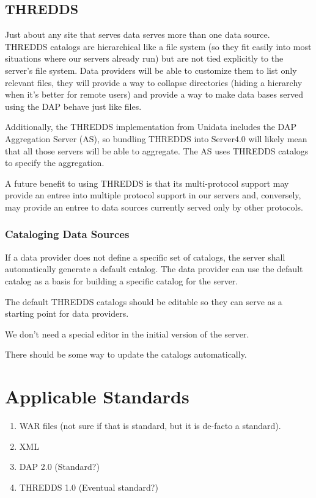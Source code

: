 \documentclass[justify]{dods-paper}
\begin{document}
\subsection{THREDDS}

Just about any site that serves data serves more than one data source. THREDDS catalogs are hierarchical like a file system (so they fit easily into most situations where our servers already run) but are not tied explicitly to the server's file system. Data providers will be able to customize them to list only relevant files, they will provide a way to collapse directories (hiding a hierarchy when it's better for remote users) and provide a way to make data bases served using the DAP behave just like files.

Additionally, the THREDDS implementation from Unidata includes the DAP Aggregation Server (AS), so bundling THREDDS into Server4.0 will likely mean that all those servers will be able to aggregate. The AS uses THREDDS catalogs to specify the aggregation.

A future benefit to using THREDDS is that its multi-protocol support may provide an entree into multiple protocol support in our servers and, conversely, may provide an entree to data sources currently served only by other protocols.

\subsubsection{Cataloging Data Sources}

If a data provider does not define a specific set of catalogs, the server shall automatically generate a default catalog. The data provider can use the default catalog as a basis for building a specific catalog for the server. 

The default THREDDS catalogs should be editable so they can serve as a starting point for data providers.

We don't need a special editor in the initial version of the server.

There should be some way to update the catalogs automatically.

\section{Applicable Standards}

\begin{enumerate}
\item WAR files (not sure if that is  standard, but it is de-facto a standard).
\item XML
\item DAP 2.0 (Standard?)
\item THREDDS 1.0 (Eventual standard?)
\end{enumerate}
\end{document}
